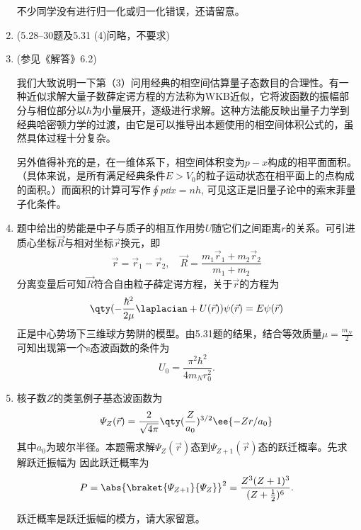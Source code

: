 \begin{enumerate}[label=\textbf{5.\arabic*}, listparindent=\parindent]
不少同学没有进行归一化或归一化错误，还请留意。
\item (5.28--30题及5.31 (4)问略，不要求)

\setcounter{enumi}{30}
\item (参见《解答》6.2)

 我们大致说明一下第（3）问用经典的相空间估算量子态数目的合理性。有一种近似求解大量子数薛定谔方程的方法称为WKB近似，它将波函数的振幅部分与相位部分以$\hbar$为小量展开，逐级进行求解。这种方法能反映出量子力学到经典哈密顿力学的过渡，由它是可以推导出本题使用的相空间体积公式的，虽然具体过程十分复杂。

另外值得补充的是，在一维体系下，相空间体积变为$p-x$构成的相平面面积。（具体来说，是所有满足经典条件$E>V_0$的粒子运动状态在相平面上的点构成的面积。）而面积的计算可写作$\oint p\dd{x}=nh$, 可见这正是旧量子论中的索末菲量子化条件。


\item 题中给出的势能是中子与质子的相互作用势$U$随它们之间距离$r$的关系。可引进质心坐标$\vec{R}$与相对坐标$\vec{r}$换元，即
\[\vec{r}=\vec{r}_1-\vec{r}_2,\quad \vec{R}=\frac{m_1\vec{r}_1+m_2\vec{r}_2}{m_1+m_2}\]
分离变量后可知$\vec{R}$符合自由粒子薛定谔方程，关于$\vec{r}$的方程为
\[\qty(-\frac{\hbar^2}{2\mu}\laplacian + U(\vec{r}))\psi(\vec{r})=E\psi(\vec{r})\]
正是中心势场下三维球方势阱的模型。由5.31题的结果，结合等效质量$\mu = \frac{m_N}{2}$可知出现第一个s态波函数的条件为
\[U_0 = \frac{\pi^2\hbar^2}{4m_N r_0^2}.\]


\item 核子数$Z$的类氢例子基态波函数为
\[\varPsi_Z(\vec{r}) = \frac{2}{\sqrt{4\pi}}\qty(\frac{Z}{a_0})^{3/2}\ee{-Zr/a_0}\]
其中$a_0$为玻尔半径。本题需求解$\varPsi_Z(\vec{r})$态到$\varPsi_{Z+1}(\vec{r})$态的跃迁概率。先求解跃迁振幅为
因此跃迁概率为
\[P = \abs{\braket{\varPsi_{Z+1}}{\varPsi_Z}}^2 = \frac{Z^3(Z+1)^3}{(Z+\frac{1}{2})^6}.\]

跃迁概率是跃迁振幅的模方，请大家留意。

\end{enumerate}

